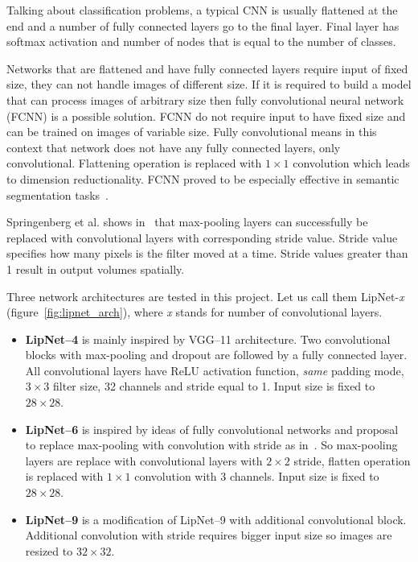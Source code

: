 \documentclass[a4paper, 11pt, table]{article}
\begin{document}
Talking about classification problems, a typical CNN is usually flattened at the end and a number of fully connected layers go to the final layer. Final layer has softmax activation and number of nodes that is equal to the number of classes. 

Networks that are flattened and have fully connected layers require input of fixed size, they can not handle images of different size. If it is required to build a model that can process images of arbitrary size then fully convolutional neural network (FCNN) is a possible solution. FCNN do not require input to have fixed size and can be trained on images of variable size. Fully convolutional means in this context that network does not have any fully connected layers, only convolutional. Flattening operation is replaced with $1 \times 1$ convolution which leads to dimension reductionality. FCNN proved to be especially effective in semantic segmentation tasks~\cite{DBLP:journals/corr/ShelhamerLD16}.

Springenberg et al. shows in~\cite{DBLP:journals/corr/SpringenbergDBR14} that max-pooling layers can successfully be replaced with convolutional layers with corresponding stride value. Stride value specifies how many pixels is the filter moved at a time. Stride values greater than 1 result in output volumes spatially. 

Three network architectures are tested in this project. Let us call them LipNet-\textit{x} (figure~\ref{fig:lipnet_arch}), where \textit{x} stands for number of convolutional layers. 

\begin{itemize}
\item \textbf{LipNet--4} is mainly inspired by VGG--11 architecture. Two convolutional blocks with max-pooling and dropout are followed by a fully connected layer. All convolutional layers have ReLU activation function, \textit{same} padding mode, $3 \times 3$ filter size, 32 channels and stride equal to 1. Input size is fixed to $28 \times 28$.

\item \textbf{LipNet--6} is inspired by ideas of fully convolutional networks and proposal to replace max-pooling with convolution with stride as in~\cite{DBLP:journals/corr/SpringenbergDBR14}. So max-pooling layers are replace with convolutional layers with $2 \times 2$ stride, flatten operation is replaced with $1 \times 1$ convolution with $3$ channels. Input size is fixed to $28 \times 28$.

\item \textbf{LipNet--9} is a modification of LipNet--9 with additional convolutional block. Additional convolution with stride requires bigger input size so images are resized to $32 \times 32$. 
\end{itemize}
\end{document}
